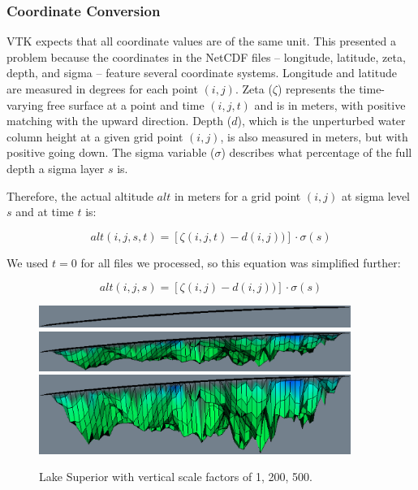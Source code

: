 \documentclass{article} %
\begin{document}
\subsubsection{Coordinate Conversion}
\label{sec:coord}

VTK expects that all coordinate values are of the same unit.  This presented a problem because the coordinates in the NetCDF files -- longitude, latitude, zeta, depth, and sigma -- feature several coordinate systems.  Longitude and latitude are measured in degrees for each point $(i, j)$.  Zeta ($\zeta$) represents the time-varying free surface at a point and time $(i, j, t)$ and is in meters, with positive matching with the upward direction.  Depth ($d$), which is the unperturbed water column height at a given grid point $(i, j)$, is also measured in meters, but with positive going down.  The sigma variable ($\sigma$) describes what percentage of the full depth a sigma layer $s$ is.

Therefore, the actual altitude $alt$ in meters for a grid point $(i, j)$ at sigma level $s$ and at time $t$ is:

\begin{equation}\label{eq:depth}
alt(i, j, s, t) = [\zeta(i, j, t) - d(i, j))] \cdot \sigma(s)
\end{equation}

We used $t = 0$ for all files we processed, so this equation was simplified further:

\begin{equation}
alt(i, j, s) = [\zeta(i, j) - d(i, j))] \cdot \sigma(s)
\end{equation}

\begin{figure}[htb]
   \centering
   \includegraphics[width=4in]{figures/vertscale1.eps}
   \includegraphics[width=4in]{figures/vertscale200.eps}
   \includegraphics[width=4in]{figures/vertscale500.eps}
   \caption{Lake Superior with vertical scale factors of 1, 200, 500.}
   \label{fig:vertscale}
\end{figure}
\end{document}
